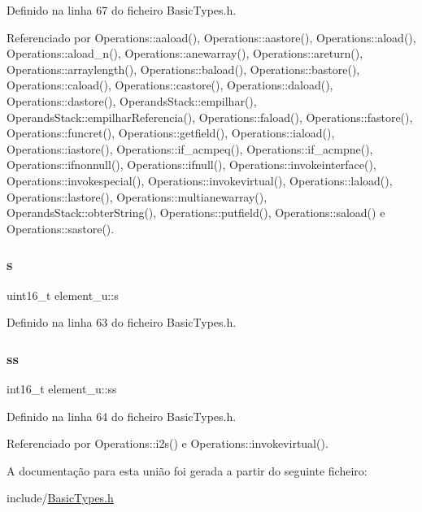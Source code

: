 Definido na linha 67 do ficheiro Basic\+Types.\+h.



Referenciado por Operations\+::aaload(), Operations\+::aastore(), Operations\+::aload(), Operations\+::aload\+\_\+n(), Operations\+::anewarray(), Operations\+::areturn(), Operations\+::arraylength(), Operations\+::baload(), Operations\+::bastore(), Operations\+::caload(), Operations\+::castore(), Operations\+::daload(), Operations\+::dastore(), Operands\+Stack\+::empilhar(), Operands\+Stack\+::empilhar\+Referencia(), Operations\+::faload(), Operations\+::fastore(), Operations\+::funcret(), Operations\+::getfield(), Operations\+::iaload(), Operations\+::iastore(), Operations\+::if\+\_\+acmpeq(), Operations\+::if\+\_\+acmpne(), Operations\+::ifnonnull(), Operations\+::ifnull(), Operations\+::invokeinterface(), Operations\+::invokespecial(), Operations\+::invokevirtual(), Operations\+::laload(), Operations\+::lastore(), Operations\+::multianewarray(), Operands\+Stack\+::obter\+String(), Operations\+::putfield(), Operations\+::saload() e Operations\+::sastore().

\mbox{\label{unionelement__u_a85c036f57770aeab7ed90947ffdfda53}} 
\subsubsection{\texorpdfstring{s}{s}}
{\footnotesize\ttfamily uint16\+\_\+t element\+\_\+u\+::s}



Definido na linha 63 do ficheiro Basic\+Types.\+h.

\mbox{\label{unionelement__u_ab90ee55202fd11a2dc3cf48c74e55dab}} 
\subsubsection{\texorpdfstring{ss}{ss}}
{\footnotesize\ttfamily int16\+\_\+t element\+\_\+u\+::ss}



Definido na linha 64 do ficheiro Basic\+Types.\+h.



Referenciado por Operations\+::i2s() e Operations\+::invokevirtual().



A documentação para esta união foi gerada a partir do seguinte ficheiro\+:\begin{DoxyCompactItemize}
\item 
include/\hyperlink{BasicTypes_8h}{Basic\+Types.\+h}\end{DoxyCompactItemize}
